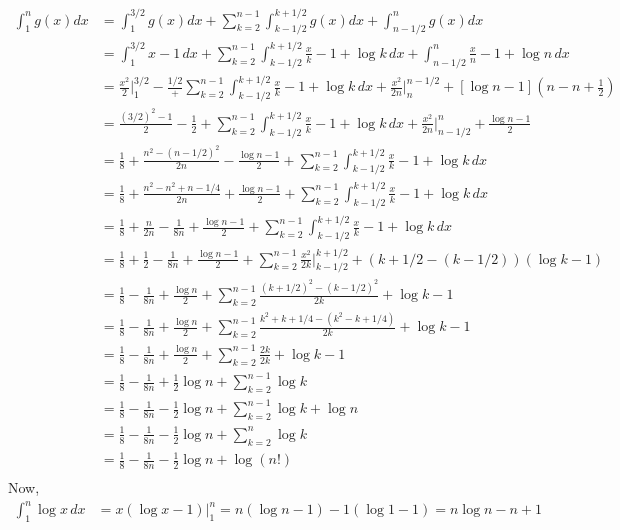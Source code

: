 \documentclass{article}
\begin{document}
\begin{align*}
  \int_{1}^n g(x) dx
  &= \int_{1}^{3/2} g(x) dx + \sum_{k=2}^{n-1} \int_{k-1/2}^{k+1/2} g(x)
    dx + \int_{n-1/2}^n g(x) dx\\
  &= \int_{1}^{3/2} x-1\, dx + \sum_{k=2}^{n-1} \int_{k-1/2}^{k+1/2}
    \frac{x}{k}-1 + \log k\,
    dx + \int_{n-1/2}^n \frac{x}{n}-1+\log n\, dx\\
  &=  \frac{x^2}{2}\bigg|_{1}^{3/2}-\frac{1/2} + \sum_{k=2}^{n-1} \int_{k-1/2}^{k+1/2}
    \frac{x}{k}-1 + \log k\,
    dx + \frac{x^2}{2n}\bigg|_{n}^{n-1/2} +[\log n
    -1]\left(n-n+\frac{1}{2}\right)\\
  &=  \frac{(3/2)^2-1}{2} -\frac{1}{2} + \sum_{k=2}^{n-1} \int_{k-1/2}^{k+1/2}
    \frac{x}{k}-1 + \log k\,
    dx + \frac{x^2}{2n}\bigg|_{n-1/2}^{n} +\frac{\log n
    -1}{2}\\
  &=  \frac{1}{8} + \frac{n^2 - (n-1/2)^2}{2n}-\frac{\log n
    -1}{2} + \sum_{k=2}^{n-1} \int_{k-1/2}^{k+1/2}
    \frac{x}{k}-1 + \log k\,
    dx  \\
  &=  \frac{1}{8} + \frac{n^2 - n^2 +n - 1/4}{2n}+\frac{\log n
    -1}{2} + \sum_{k=2}^{n-1} \int_{k-1/2}^{k+1/2}
    \frac{x}{k}-1 + \log k\,
    dx  \\
  &=  \frac{1}{8} + \frac{n}{2n} - \frac{1}{8n} +\frac{\log n
    -1}{2} + \sum_{k=2}^{n-1} \int_{k-1/2}^{k+1/2}
    \frac{x}{k}-1 + \log k\,
    dx  \\
  &=  \frac{1}{8} + \frac{1}{2} - \frac{1}{8n} +\frac{\log n
    -1}{2}  + \sum_{k=2}^{n-1}
    \frac{x^2}{2k}\bigg|_{k-1/2}^{k+1/2} + (k+1/2-(k-1/2))(\log k-1)
  \\
  &= \frac{1}{8} - \frac{1}{8n} +\frac{\log n}{2} + \sum_{k=2}^{n-1}
    \frac{(k+1/2)^2-(k-1/2)^2}{2k} + \log k-1 \\
  &= \frac{1}{8} - \frac{1}{8n} +\frac{\log n}{2} + \sum_{k=2}^{n-1}
    \frac{k^2+k +1/4 -(k^2-k +1/4)}{2k} + \log k-1 \\
  &= \frac{1}{8} - \frac{1}{8n} +\frac{\log n}{2} + \sum_{k=2}^{n-1}
    \frac{2k}{2k} + \log k-1 \\
&= \frac{1}{8} - \frac{1}{8n} +\frac{1}{2}\log n +
                                  \sum_{k=2}^{n-1}\log k \\
  &= \frac{1}{8} - \frac{1}{8n} -\frac{1}{2}\log n +
    \sum_{k=2}^{n-1}\log k +\log n \\
  &= \frac{1}{8} - \frac{1}{8n} -\frac{1}{2}\log n +
    \sum_{k=2}^{n}\log k \\
  &= \frac{1}{8} - \frac{1}{8n} -\frac{1}{2}\log n +
    \log(n!) \\
\end{align*}
\newpage
Now,
\begin{align*}
  \int_{1}^n \log x\, dx &= x(\log x -1) \bigg|_{1}^n = n(\log n -1)
  -1(\log 1 -1) =  n\log n -n +1
\end{align*}
\end{document}
